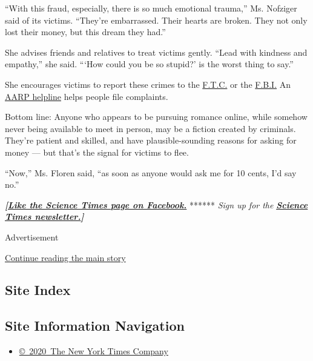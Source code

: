``With this fraud, especially, there is so much emotional trauma,'' Ms.
Nofziger said of its victims. ``They're embarrassed. Their hearts are
broken. They not only lost their money, but this dream they had.''

She advises friends and relatives to treat victims gently. ``Lead with
kindness and empathy,'' she said. ```How could you be so stupid?' is the
worst thing to say.''

She encourages victims to report these crimes to the
\href{https://www.ftccomplaintassistant.gov/}{F.T.C.} or the
\href{https://www.ic3.gov/default.aspx}{F.B.I.} An
\href{https://www.aarp.org/money/scams-fraud/}{AARP helpline} helps
people file complaints.

Bottom line: Anyone who appears to be pursuing romance online, while
somehow never being available to meet in person, may be a fiction
created by criminals. They're patient and skilled, and have
plausible-sounding reasons for asking for money --- but that's the
signal for victims to flee.

``Now,'' Ms. Floren said, ``as soon as anyone would ask me for 10 cents,
I'd say no.''

\textbf{\emph{{[}}\href{https://slack-redir.net/link?url=http\%3A\%2F\%2Fon.fb.me\%2F1paTQ1h\&v=3}{\emph{Like
the Science Times page on Facebook.}}} ****** \emph{\textbar{} Sign up
for the}
\textbf{\href{https://slack-redir.net/link?url=http\%3A\%2F\%2Fnyti.ms\%2F1MbHaRU\&v=3}{\emph{Science
Times newsletter.}}\emph{{]}}}

Advertisement

\protect\hyperlink{after-bottom}{Continue reading the main story}

\hypertarget{site-index}{%
\subsection{Site Index}\label{site-index}}

\hypertarget{site-information-navigation}{%
\subsection{Site Information
Navigation}\label{site-information-navigation}}

\begin{itemize}
\tightlist
\item
  \href{https://help.nytimes3xbfgragh.onion/hc/en-us/articles/115014792127-Copyright-notice}{©~2020~The
  New York Times Company}
\end{itemize}

